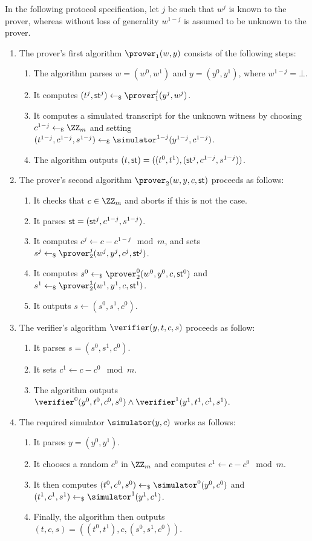 \documentclass[runningheads]{llncs}
\begin{document}
  In the following protocol specification, let $j$ be such that $w^j$ is known to the prover, whereas without loss of generality $w^{1-j}$ is assumed to be unknown to the prover.
\begin{enumerate}
  \item
    The prover's first algorithm $\prover_1(w,y)$ consists of the following steps:
    \begin{enumerate}
      \item
        The algorithm parses $w=(w^0,w^1)$ and $y=(y^0,y^1)$, where $w^{1-j}=\bot$.
      \item
        It computes $(t^j,\st^j)\getsr\prover_1^j(y^j,w^j)$.
      \item
        It computes a simulated transcript for the unknown witness by choosing $c^{1-j}\getsr\ZZ_m$ and setting $(t^{1-j},c^{1-j},s^{1-j})\getsr\simulator^{1-j}(y^{1-j},c^{1-j})$.
      \item
	The algorithm outputs $(t,\mathsf{st}) = ((t^0,t^1),(\mathsf{st}^j,c^{1-j},s^{1-j}))$.
    \end{enumerate}
  \item
    The prover's second algorithm $\prover_2(w,y,c,\st)$ proceeds as follows:
    \begin{enumerate}
      \item
        It checks that $c\in\ZZ_m$ and aborts if this is not the case.
      \item
	It parses $\mathsf{st}=(\mathsf{st}^j,c^{1-j},s^{1-j})$.
      \item
        It computes $c^j\gets c-c^{1-j}\mod m$, and sets $s^j\getsr\prover_2^j(w^j,y^j,c^j,\st^j)$.
      \item
        It computes $s^0\getsr\prover_2^0(w^0,y^0,c,\st^0)$ and $s^1\getsr\prover_2^1(w^1,y^1,c,\st^1)$.
      \item
        It outputs $s\gets(s^0,s^1,c^0)$.
    \end{enumerate}
  \item
    The verifier's algorithm $\verifier(y,t,c,s)$ proceeds as follow:
    \begin{enumerate}
      \item
        It  parses $s=(s^0,s^1,c^0)$.
      \item 
        It sets $c^1\gets c-c^0\mod m$.
      \item
	The algorithm outputs $\verifier^0(y^0,t^0,c^0,s^0)\land\verifier^1(y^1,t^1,c^1,s^1)$.
    \end{enumerate}
  \item
    The required simulator $\simulator(y,c)$ works as follows:
    \begin{enumerate}
      \item
        It parses $y=(y^0,y^1)$.
      \item
        It chooses a random $c^0$ in $\ZZ_m$ and computes $c^1\gets c-c^0 \mod m$.
      \item
        It then computes $(t^0,c^0,s^0)\getsr\simulator^0(y^0,c^0)$ and $(t^1,c^1,s^1)\getsr\simulator^1(y^1,c^1)$.
      \item
        Finally, the algorithm then outputs $(t,c,s)=((t^0,t^1),c,(s^0,s^1,c^0))$.
    \end{enumerate}
\end{enumerate}
\end{document}
